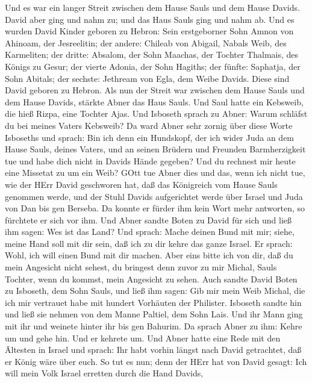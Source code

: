  Und es war ein langer Streit zwischen dem Hause Sauls und
dem Hause Davids. David aber ging und nahm zu; und das Haus Sauls ging
und nahm ab.  Und es wurden David Kinder geboren zu Hebron:
Sein erstgeborner Sohn Amnon von Ahinoam, der Jesreelitin; 
der andere: Chileab von Abigail, Nabals Weib, des Karmeliten; der
dritte: Absalom, der Sohn Maachas, der Tochter Thalmais, des Königs zu
Gesur;  der vierte Adonia, der Sohn Hagiths; der fünfte:
Saphatja, der Sohn Abitals;  der sechste: Jethream von Egla,
dem Weibe Davids. Diese sind David geboren zu Hebron.  Als
nun der Streit war zwischen dem Hause Sauls und dem Hause Davids,
stärkte Abner das Haus Sauls.  Und Saul hatte ein Kebsweib,
die hieß Rizpa, eine Tochter Ajas. Und Isboseth sprach zu Abner: Warum
schläfst du bei meines Vaters Kebsweib?  Da ward Abner sehr
zornig über diese Worte Isboseths und sprach: Bin ich denn ein
Hundskopf, der ich wider Juda an dem Hause Sauls, deines Vaters, und an
seinen Brüdern und Freunden Barmherzigkeit tue und habe dich nicht in
Davids Hände gegeben? Und du rechnest mir heute eine Missetat zu um ein
Weib?  GOtt tue Abner dies und das, wenn ich nicht tue, wie
der HErr David geschworen hat,  daß das Königreich vom
Hause Sauls genommen werde, und der Stuhl Davids aufgerichtet werde über
Israel und Juda von Dan bis gen Berseba.  Da konnte er
fürder ihm kein Wort mehr antworten, so fürchtete er sich vor ihm.
 Und Abner sandte Boten zu David für sich und ließ ihm
sagen: Wes ist das Land? Und sprach: Mache deinen Bund mit mir; siehe,
meine Hand soll mit dir sein, daß ich zu dir kehre das ganze Israel.
 Er sprach: Wohl, ich will einen Bund mit dir machen. Aber
eins bitte ich von dir, daß du mein Angesicht nicht sehest, du bringest
denn zuvor zu mir Michal, Sauls Tochter, wenn du kommst, mein Angesicht
zu sehen.  Auch sandte David Boten zu Isboseth, dem Sohn
Sauls, und ließ ihm sagen: Gib mir mein Weib Michal, die ich mir
vertrauet habe mit hundert Vorhäuten der Philister. 
Isboseth sandte hin und ließ sie nehmen von dem Manne Paltiel, dem Sohn
Lais.  Und ihr Mann ging mit ihr und weinete hinter ihr bis
gen Bahurim. Da sprach Abner zu ihm: Kehre um und gehe hin. Und er
kehrete um.  Und Abner hatte eine Rede mit den Ältesten in
Israel und sprach: Ihr habt vorhin längst nach David getrachtet, daß er
König wäre über euch.  So tut es nun; denn der HErr hat von
David gesagt: Ich will mein Volk Israel erretten durch die Hand Davids,
